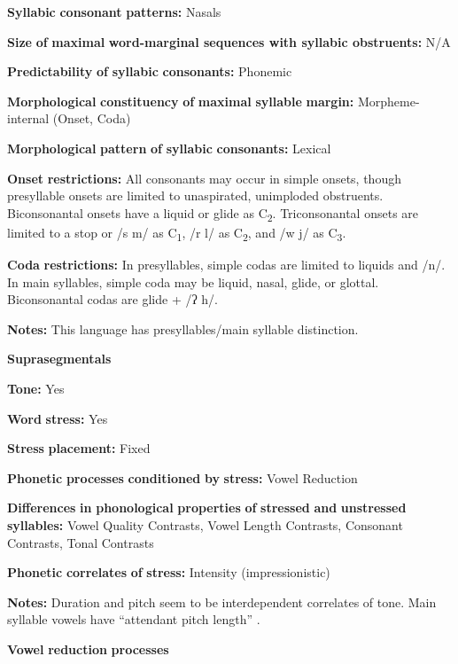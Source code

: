 \textbf{Syllabic} \textbf{consonant} \textbf{patterns:} Nasals

\textbf{Size} \textbf{of} \textbf{maximal} \textbf{word{}-marginal sequences with syllabic obstruents:} N/A

\textbf{Predictability} \textbf{of} \textbf{syllabic} \textbf{consonants:} Phonemic

\textbf{Morphological} \textbf{constituency} \textbf{of} \textbf{maximal} \textbf{syllable} \textbf{margin:} Morpheme-internal (Onset, Coda)

\textbf{Morphological} \textbf{pattern} \textbf{of} \textbf{syllabic} \textbf{consonants:} Lexical

\textbf{Onset} \textbf{restrictions:} All consonants may occur in simple onsets, though presyllable onsets are limited to unaspirated, unimploded obstruents. Biconsonantal onsets have a liquid or glide as C\textsubscript{2}. Triconsonantal onsets are limited to a stop or /s m/ as C\textsubscript{1}, /r l/ as C\textsubscript{2}, and /w j/ as C\textsubscript{3}.

\textbf{Coda} \textbf{restrictions:} In presyllables, simple codas are limited to liquids and /n/. In main syllables, simple coda may be liquid, nasal, glide, or glottal. Biconsonantal codas are glide + /ʔ h/.

\textbf{Notes:} This language has presyllables/main syllable distinction.

\textbf{Suprasegmentals}

\textbf{Tone:} Yes

\textbf{Word} \textbf{stress:} Yes

\textbf{Stress} \textbf{placement:} Fixed

\textbf{Phonetic} \textbf{processes} \textbf{conditioned} \textbf{by} \textbf{stress:} Vowel Reduction

\textbf{Differences} \textbf{in} \textbf{phonological} \textbf{properties} \textbf{of} \textbf{stressed} \textbf{and} \textbf{unstressed} \textbf{syllables:} Vowel Quality Contrasts, Vowel Length Contrasts, Consonant Contrasts, Tonal Contrasts

\textbf{Phonetic} \textbf{correlates} \textbf{of} \textbf{stress:} Intensity (impressionistic)

\textbf{Notes:} Duration and pitch seem to be interdependent correlates of tone. Main syllable vowels have “attendant pitch length” \citep[32]{Olsen2014}.

\textbf{Vowel} \textbf{reduction} \textbf{processes}

